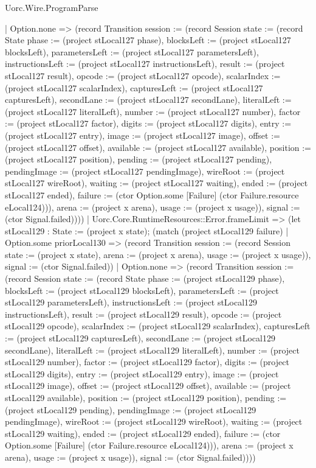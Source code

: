 \begin{lexlean}{Uorc.Wire.ProgramParse}
\begin{semanticmodule}
{        | Option.none => (record Transition {session := (record Session {state := (record State {phase := (project stLocal127 phase), blocksLeft := (project stLocal127 blocksLeft), parametersLeft := (project stLocal127 parametersLeft), instructionsLeft := (project stLocal127 instructionsLeft), result := (project stLocal127 result), opcode := (project stLocal127 opcode), scalarIndex := (project stLocal127 scalarIndex), capturesLeft := (project stLocal127 capturesLeft), secondLane := (project stLocal127 secondLane), literalLeft := (project stLocal127 literalLeft), number := (project stLocal127 number), factor := (project stLocal127 factor), digits := (project stLocal127 digits), entry := (project stLocal127 entry), image := (project stLocal127 image), offset := (project stLocal127 offset), available := (project stLocal127 available), position := (project stLocal127 position), pending := (project stLocal127 pending), pendingImage := (project stLocal127 pendingImage), wireRoot := (project stLocal127 wireRoot), waiting := (project stLocal127 waiting), ended := (project stLocal127 ended), failure := (ctor Option.some [Failure] (ctor Failure.resource eLocal124))}), arena := (project x arena), usage := (project x usage)}), signal := (ctor Signal.failed)})))
      | Uorc.Core.RuntimeResources::Error.frameLimit => (let stLocal129 : State := (project x state); (match (project stLocal129 failure)
        | Option.some priorLocal130 => (record Transition {session := (record Session {state := (project x state), arena := (project x arena), usage := (project x usage)}), signal := (ctor Signal.failed)})
        | Option.none => (record Transition {session := (record Session {state := (record State {phase := (project stLocal129 phase), blocksLeft := (project stLocal129 blocksLeft), parametersLeft := (project stLocal129 parametersLeft), instructionsLeft := (project stLocal129 instructionsLeft), result := (project stLocal129 result), opcode := (project stLocal129 opcode), scalarIndex := (project stLocal129 scalarIndex), capturesLeft := (project stLocal129 capturesLeft), secondLane := (project stLocal129 secondLane), literalLeft := (project stLocal129 literalLeft), number := (project stLocal129 number), factor := (project stLocal129 factor), digits := (project stLocal129 digits), entry := (project stLocal129 entry), image := (project stLocal129 image), offset := (project stLocal129 offset), available := (project stLocal129 available), position := (project stLocal129 position), pending := (project stLocal129 pending), pendingImage := (project stLocal129 pendingImage), wireRoot := (project stLocal129 wireRoot), waiting := (project stLocal129 waiting), ended := (project stLocal129 ended), failure := (ctor Option.some [Failure] (ctor Failure.resource eLocal124))}), arena := (project x arena), usage := (project x usage)}), signal := (ctor Signal.failed)})))
}
\end{semanticmodule}
\end{lexlean}
